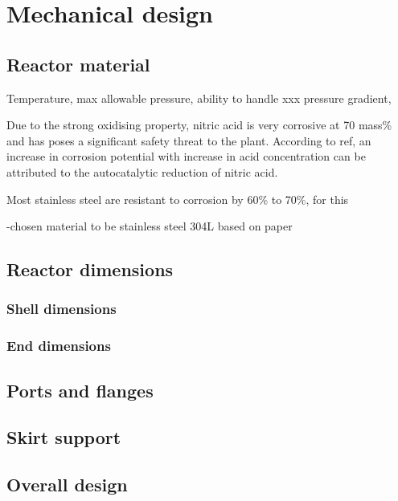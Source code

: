 \section{Mechanical design}
\subsection{Reactor material}
Temperature, max allowable pressure, ability to handle xxx pressure gradient, 

Due to the strong oxidising property, nitric acid is very corrosive at 70 mass\% and has poses a significant safety threat to the plant. According to ref, an increase in corrosion potential with increase in acid concentration can be attributed to the autocatalytic reduction of nitric acid. 

Most stainless steel are resistant to corrosion by 60\% to 70\%, for this 


-chosen material to be stainless steel 304L based on paper
\subsection{Reactor dimensions}
\subsubsection{Shell dimensions}
\subsubsection{End dimensions}
\subsection{Ports and flanges}
\subsection{Skirt support}
\subsection{Overall design}

